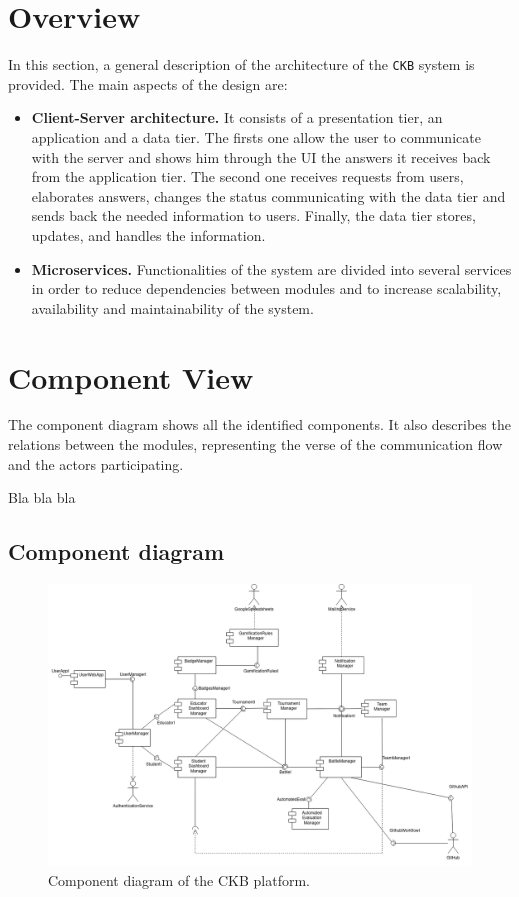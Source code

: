 \section{Overview}
\label{sec: overview}%
In this section, a general description of the architecture of the \verb|CKB| system is provided.
The main aspects of the design are:
\begin{itemize}
    \item \textbf{Client-Server architecture. } It consists of a presentation tier, an application and a data tier.
    The firsts one allow the user to communicate with the server and shows him through the UI the answers it receives back from the application tier.
    The second one receives requests from users, elaborates answers, changes the status communicating with the data tier and sends back the needed information to users.
    Finally, the data tier stores, updates, and handles the information.
    \item \textbf{Microservices. } Functionalities of the system are divided into several services in order to reduce dependencies between
    modules and to increase scalability, availability and maintainability of the system.
\end{itemize}

\section{Component View}
\label{sec: component_view}%
The component diagram shows all the identified components.
It also describes the relations between the modules, representing the verse of the communication flow and the actors participating.

Bla bla bla

\subsection{Component diagram}
\label{subsec:component_diagram}%
\begin{figure} [H]
    \begin{center}
        \includegraphics[width=1\linewidth]{Images/compdiag.png}
        \caption{Component diagram of the CKB platform.}
        \label{fig: cd}
    \end{center}
\end{figure}

